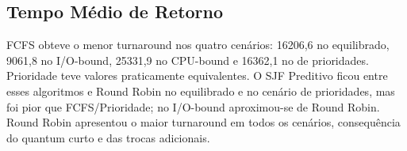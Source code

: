 \documentclass[conference]{IEEEtran}
\begin{document}
\begin{table}[!htbp]
\centering
\caption{Médias das 100 seeds. T: turnaround; TC: trocas de contexto; J: Jain do slowdown (\%).}
\label{tab:resultados}
\small
{}
\end{table}

\subsection{Tempo Médio de Retorno}

FCFS obteve o menor turnaround nos quatro cenários: 16206,6 no equilibrado, 9061,8 no I/O-bound, 25331,9 no CPU-bound e 16362,1 no de prioridades. Prioridade teve valores praticamente equivalentes. O SJF Preditivo ficou entre esses algoritmos e Round Robin no equilibrado e no cenário de prioridades, mas foi pior que FCFS/Prioridade; no I/O-bound aproximou-se de Round Robin. Round Robin apresentou o maior turnaround em todos os cenários, consequência do quantum curto e das trocas adicionais.
\end{document}
